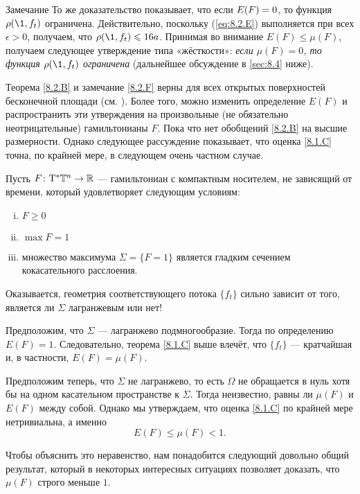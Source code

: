 \begin{ex}{Замечание}\label{8.2.F}
То же доказательство показывает, что если $E (F) \z= 0$, то функция
$\rho (\1, f_t)$ ограничена. 
Действительно, поскольку (\ref{eq:8.2.E}) выполняется при всех
$\epsilon> 0$, получаем, что $\rho (\1, f_t) \z\le 16a$. 
Принимая во внимание $E (F) \le \mu (F)$, получаем следующее
утверждение типа «жёсткости»: \textit{если $\mu (F) = 0$, то функция $\rho
(\1, f_t)$ ограничена} (дальнейшее обсуждение в \ref{sec:8.4} ниже). 
\end{ex}

Теорема \ref{8.2.B} и замечание \ref{8.2.F} верны для всех открытых
поверхностей бесконечной площади (см. \cite{PS}). 
Более того, можно изменить определение $E (F)$ и распространить эти
утверждения на произвольные (не обязательно неотрицательные)
гамильтонианы $F$. 
Пока что нет обобщений \ref{8.2.B} на высшие размерности.
Однако следующее рассуждение показывает, что оценка \ref{8.1.C} точна,
по крайней мере, в следующем очень частном случае. 

Пусть $F\colon \mathrm{T}^\ast \mathbb{T}^n \to \mathbb{R}$ --- гамильтониан с компактным носителем, не зависящий от времени, который удовлетворяет следующим условиям: 
\begin{enumerate}[(i)]
\item $F \ge 0 $
\item $\max F = 1$ 
\item множество максимума $\Sigma =\{F = 1\}$ является гладким сечением кокасательного расслоения. 
\end{enumerate}

Оказывается, геометрия соответствующего потока $\{f_t\}$ сильно
зависит от того, является ли $\Sigma$ лагранжевым или нет! 

Предположим, что $\Sigma$ --- лагранжево подмногообразие.
Тогда по определению $E (F) = 1$.
Следовательно, теорема \ref{8.1.C} выше влечёт, что $\{f_t\}$ ---
кратчайшая и, в частности, $E (F) = \mu (F)$. 

Предположим теперь, что $\Sigma$ не лагранжево, то есть $\Omega$ не
обращается в нуль хотя бы на одном касательном пространстве к
$\Sigma$. 
Тогда неизвестно, равны ли $\mu (F)$ и $E (F)$ между собой.
Однако мы утверждаем, что оценка \ref{8.1.C} по крайней мере
нетривиальна, а именно  
\begin{equation}
E (F) \le \mu (F) <1.\label{8.2.G}
\end{equation}

Чтобы объяснить это неравенство, нам понадобится следующий довольно
общий результат, который в некоторых интересных ситуациях позволяет
доказать, что $\mu (F)$ строго меньше $1$. 

